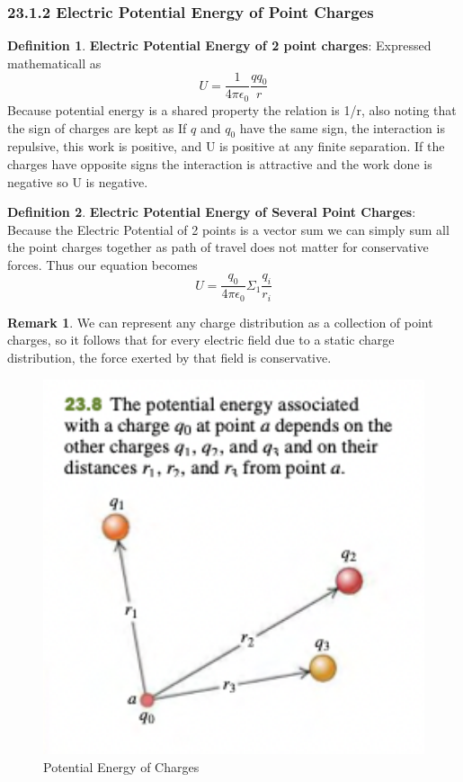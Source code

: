 \documentclass[12pt]{amsart}
\theoremstyle{definition}
\newtheorem{definition}{Definition} %
\newtheorem*{remark}{Remark}        %
\numberwithin{equation}{theorem}    %
\begin{document}
\subsubsection*{23.1.2 Electric Potential Energy of Point Charges}

\begin{definition}
    \textbf{Electric Potential Energy of 2 point charges}:
    Expressed mathematicall as $$U = \frac{1}{4\pi\epsilon _0}\frac{qq_0}{r}$$
    Because potential energy is a shared property the relation is 1/r, also 
    noting that the sign of charges are kept as If $q$ and $q_0$ have the 
    same sign, the interaction is repulsive, this work is positive, and 
    U is positive at any finite separation. If the charges have opposite signs 
    the interaction is attractive and the work done is negative so U is negative. 
\end{definition}

\begin{definition}
    \textbf{Electric Potential Energy of Several Point Charges}:
    Because the Electric Potential of 2 points is a vector sum we can simply sum
    all the point charges together as path of travel does not matter for conservative
    forces. Thus our equation becomes $$U = \frac{q_0}{4\pi \epsilon _0} \Sigma _1 \frac{q_i}{r_i}$$
    \begin{remark}
        We can represent any charge distribution as a collection of point 
        charges, so it follows that for every electric field due to a static 
        charge distribution, the force exerted by that field is conservative.
    \end{remark}
\end{definition}


\begin{figure}[H]
    \centering
    \includegraphics[width=5in]{Media/Potential.png}
    \caption{Potential Energy of Charges}
    \label{Potential Energy of Charges}
\end{figure}
\end{document}
